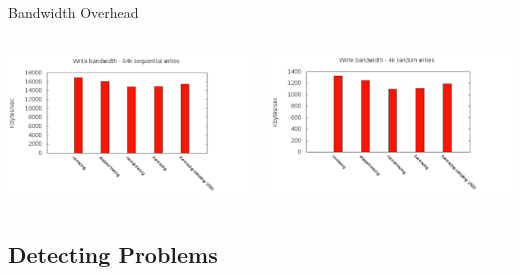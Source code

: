 \begin{frame}{Bandwidth Overhead}
\begin{columns}
    \begin{column}{0.5\textwidth}
        \begin{center}
            \includegraphics[scale=0.3]{images/64.png}
        \end{center}
    \end{column}
    \begin{column}{0.5\textwidth}
        \begin{center}
            \includegraphics[scale=0.3]{images/4.png}
        \end{center}
    \end{column}
\end{columns}
\end{frame}

\subsection{Detecting Problems}

